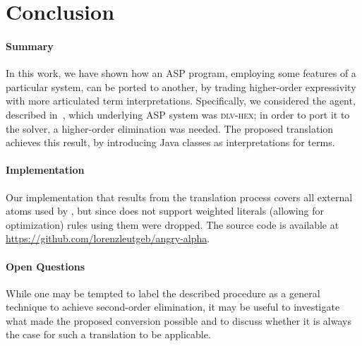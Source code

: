 \section{Conclusion}
\label{sec:conc}

\paragraph{Summary} In this work, we have shown how an ASP program, employing some features of a particular system, can be ported to another, by trading higher-order expressivity with more articulated term interpretations.
Specifically, we considered the \ah agent, described in~\cite{angryhex}, which underlying ASP system was \textsc{dlv-hex}; in order to port it to the \al solver, a higher-order elimination was needed.
The proposed translation achieves this result, by introducing Java classes as interpretations for terms.

\paragraph{Implementation} Our implementation that results from the translation process covers all external atoms used by \ah, but since \al does not support weighted literals (allowing for optimization) rules using them were dropped. The source code is available at \url{https://github.com/lorenzleutgeb/angry-alpha}.

\paragraph{Open Questions} While one may be tempted to label the described procedure as a general technique to achieve second-order elimination, it may be useful to investigate what made the proposed conversion possible and to discuss whether it is always the case for such a translation to be applicable.


